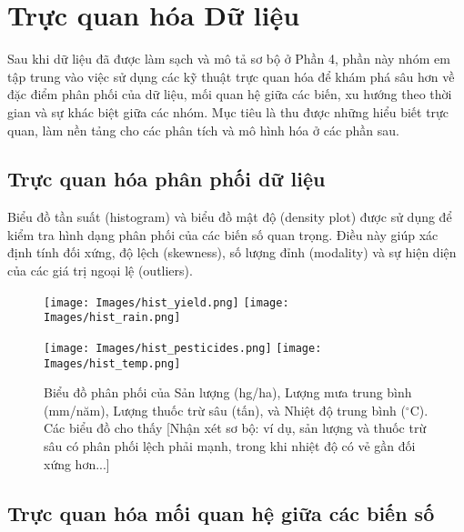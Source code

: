 \section{Trực quan hóa Dữ liệu}

Sau khi dữ liệu đã được làm sạch và mô tả sơ bộ ở Phần 4, phần này nhóm em tập trung vào việc sử dụng các kỹ thuật trực quan hóa để khám phá sâu hơn về đặc điểm phân phối của dữ liệu, mối quan hệ giữa các biến, xu hướng theo thời gian và sự khác biệt giữa các nhóm. Mục tiêu là thu được những hiểu biết trực quan, làm nền tảng cho các phân tích và mô hình hóa ở các phần sau.


\subsection{Trực quan hóa phân phối dữ liệu}

Biểu đồ tần suất (histogram) và biểu đồ mật độ (density plot) được sử dụng để kiểm tra hình dạng phân phối của các biến số quan trọng. Điều này giúp xác định tính đối xứng, độ lệch (skewness), số lượng đỉnh (modality) và sự hiện diện của các giá trị ngoại lệ (outliers).

\begin{figure}[H] 
    \centering
    \texttt{[image: Images/hist\_yield.png]} 
    \hfill
    \texttt{[image: Images/hist\_rain.png]}
    
    \vspace{0.5cm} %
    
    \texttt{[image: Images/hist\_pesticides.png]}
    \hfill
    \texttt{[image: Images/hist\_temp.png]}
    \vspace{8pt}
    \caption{Biểu đồ phân phối của Sản lượng (hg/ha), Lượng mưa trung bình (mm/năm), Lượng thuốc trừ sâu (tấn), và Nhiệt độ trung bình ($^\circ$C). Các biểu đồ cho thấy [Nhận xét sơ bộ: ví dụ, sản lượng và thuốc trừ sâu có phân phối lệch phải mạnh, trong khi nhiệt độ có vẻ gần đối xứng hơn...]}
    \label{fig:distributions}
\end{figure}


\subsection{Trực quan hóa mối quan hệ giữa các biến số}
\label{subsec:viz_relationships}

